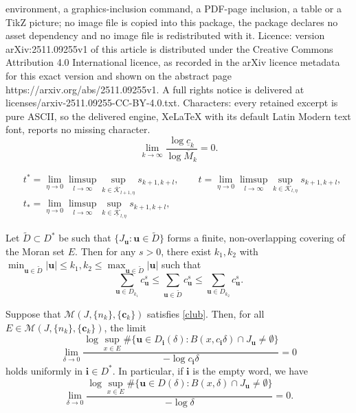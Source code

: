 \documentclass[10pt,a4paper]{amsart}
\newcommand{\bu}{\mathbf{u}}
\newcommand{\ccc}{\mathbf{c}}
\newcommand{\de}{\delta}
\newcommand{\iii}{\mathbf{i}}
\newcommand{\kk}{\mathcal{K}}
\newcommand{\ok}{\overline{\mathcal{K}}}
\newcommand{\om}{\overline{M}}
\newcommand{\uc}{\underline{c}}
\newcommand{\uk}{\underline{\mathcal{K}}}
\renewcommand{\leq}{\leqslant}
\begin{document}
environment, a graphics-inclusion command, a PDF-page inclusion, a table or a TikZ picture; no image file is copied into this package, the package declares no asset dependency and no image file is redistributed with it. Licence: version arXiv:2511.09255v1 of this article is distributed under the Creative Commons Attribution 4.0 International licence, as recorded in the arXiv licence metadata for this exact version and shown on the abstract page https://arxiv.org/abs/2511.09255v1. A full rights notice is delivered at licenses/arxiv-2511.09255-CC-BY-4.0.txt. Characters: every retained excerpt is pure ASCII, so the delivered engine, XeLaTeX with its default Latin Modern text font, reports no missing character.
	\begin{equation}\label{club}
		\lim_{k\to\infty}\frac{\log \uc_k}{\log \om_k}=0.
	\end{equation}

	\begin{equation}\label{def_t*tt*}
		\begin{split}
			&t^*=\lim_{\eta\to 0}\limsup_{l\to\infty} \sup_{k\in \ok_{l+1,\eta}} s_{k+1,k+l}, \qquad
			t=\lim_{\eta\to 0}\limsup_{l\to\infty}\sup_{k\in \kk_{l,\eta}} s_{k+1,k+l}, \\
			&t_*=\lim_{\eta\to 0}\limsup_{l\to\infty}\sup_{k\in \uk_{l,\eta}} s_{k+1,k+l}, 
		\end{split}
	\end{equation}

	\begin{lemma}\label{compensate}
	Let $\tilde{D}\subset D^*$ be such that $\{J_{\bu}:\bu\in\tilde{D}\}$ forms a finite, non-overlapping covering of the Moran set $E$. Then for any $s>0$, there exist $k_1,k_2$ with $\min_{\bu\in\tilde{D}}|\bu|\leq k_1,k_2\leq \max_{\bu\in\tilde{D}}|\bu|$ such that
		\[
		\sum_{\bu\in{D}_{k_1}}c^{s}_{\bu}\leq\sum_{\bu\in\tilde{D}}c^{s}_{\bu}\leq\sum_{\bu\in{D}_{k_2}}c^{s}_{\bu}.
		\]
	\end{lemma}

	\begin{lemma}\label{numberofcap}
Suppose  that $\mathcal{M}(J,\{n_k\},\{\ccc_k\})$ satisfies \eqref{club}.  Then, for all $E\in\mathcal{M}(J,\{n_k\},\{\ccc_k\})$,  the limit
		\[
		\lim_{\de\to 0}\frac{\log \sup_{x\in E}\#\{\bu\in D_{\iii}(\de):B(x,c_{\iii}\de)\cap J_{\bu}\neq \emptyset\}}{-\log c_{\iii}\de}=0
		\]
		holds uniformly in  $\iii\in D^*$. In particular, if $\iii$ is the empty word, we have 
	\begin{equation}\label{AWSC}
		\lim_{\de\to 0}\frac{\log \sup_{x\in E}\#\{\bu\in D(\de):B(x,\de)\cap J_{\bu}\neq \emptyset\}}{-\log\de}=0.
		\end{equation}
	\end{lemma}
\end{document}
